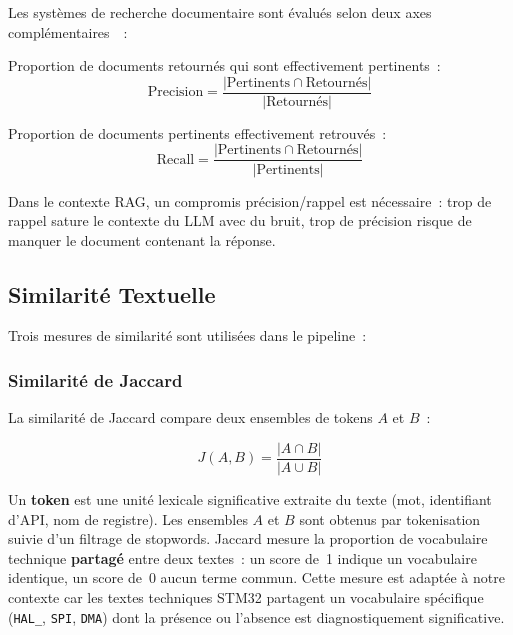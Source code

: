 Les systèmes de recherche documentaire sont évalués selon deux axes complémentaires~\cite{manning2008ir}~:

\begin{description}[leftmargin=2cm, labelwidth=1.8cm]
  \item[Précision] Proportion de documents retournés qui sont effectivement pertinents~:
  \begin{equation}
    \text{Precision} = \frac{|\text{Pertinents} \cap \text{Retournés}|}{|\text{Retournés}|}
    \label{eq:precision}
  \end{equation}
  
  \item[Rappel] Proportion de documents pertinents effectivement retrouvés~:
  \begin{equation}
    \text{Recall} = \frac{|\text{Pertinents} \cap \text{Retournés}|}{|\text{Pertinents}|}
    \label{eq:recall}
  \end{equation}
\end{description}

Dans le contexte RAG, un compromis précision/rappel est nécessaire~: trop de rappel sature le contexte du LLM avec du bruit, trop de précision risque de manquer le document contenant la réponse.

\subsection{Similarité Textuelle}
\label{sec:def_similarity}

Trois mesures de similarité sont utilisées dans le pipeline~:

\subsubsection{Similarité de Jaccard}

La similarité de Jaccard compare deux ensembles de tokens $A$ et $B$~:

\begin{equation}
J(A, B) = \frac{|A \cap B|}{|A \cup B|}
\label{eq:jaccard_def}
\end{equation}

Un \textbf{token} est une unité lexicale significative extraite du texte (mot, identifiant d'API, nom de registre). Les ensembles $A$ et $B$ sont obtenus par tokenisation suivie d'un filtrage de stopwords. Jaccard mesure la proportion de vocabulaire technique \textbf{partagé} entre deux textes~: un score de~1 indique un vocabulaire identique, un score de~0 aucun terme commun. Cette mesure est adaptée à notre contexte car les textes techniques STM32 partagent un vocabulaire spécifique (\texttt{HAL\_}, \texttt{SPI}, \texttt{DMA}) dont la présence ou l'absence est diagnostiquement significative.

